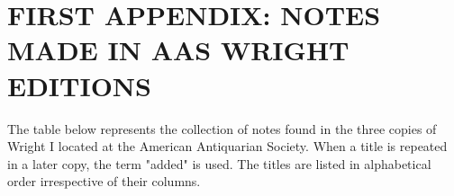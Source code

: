 %
%
%
%



\chapter{\uppercase{First Appendix: Notes Made in AAS Wright Editions}}

The table below represents the collection of notes found in the three copies of Wright I located at the American Antiquarian Society. When a title is repeated in a later copy, the term "added" is used. The titles are listed in alphabetical order irrespective of their columns.
